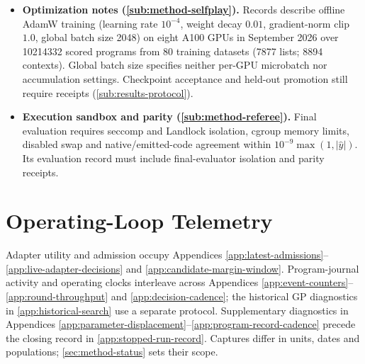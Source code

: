 \begin{itemize}[leftmargin=1.4em,itemsep=2pt,topsep=3pt]
  The registered total includes zero-weight stability and loss-scale
  terms, so it measures neither learned nor exercised capacity. Approximately
  6.90 million parameters lie outside writer token generation and share no
  weights with it: game-day decoding bypasses them; native loading requires them.
  \item \textbf{Optimization notes (\cref{sub:method-selfplay}).}
  Records describe offline AdamW training (learning rate $10^{-4}$,
  weight decay $0.01$, gradient-norm clip $1.0$, global batch size \num{2048})
  on eight A100 GPUs in September 2026 over \num{10214332} scored programs from
  80 training datasets (\num{7877} lists; \num{8894} contexts). Global batch size specifies
  neither per-GPU microbatch nor accumulation settings.
  Checkpoint acceptance and held-out promotion still require receipts
  (\cref{sub:results-protocol}).
  \item \textbf{Execution sandbox and parity (\cref{sub:method-referee}).}
  Final evaluation requires seccomp and Landlock isolation, cgroup memory
  limits, disabled swap and native/emitted-code agreement within
  $10^{-9}\max(1,|\hat{y}|)$. Its evaluation record must include final-evaluator isolation and parity
  receipts.
\end{itemize}

\section{Operating-Loop Telemetry}\label{app:flywheel-telemetry}

Adapter utility and admission occupy Appendices \ref{app:latest-admissions}--\ref{app:live-adapter-decisions}
and \ref{app:candidate-margin-window}. Program-journal activity and operating
clocks interleave across Appendices \ref{app:event-counters}--\ref{app:round-throughput}
and \ref{app:decision-cadence}; the historical GP diagnostics in
\ref{app:historical-search} use a separate protocol.
Supplementary diagnostics in Appendices \ref{app:parameter-displacement}--\ref{app:program-record-cadence}
precede the closing record in \ref{app:stopped-run-record}. Captures differ in
units, dates and populations; \cref{sec:method-status} sets their scope.

